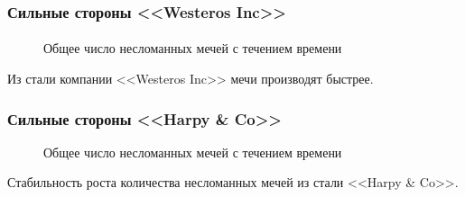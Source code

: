 \documentclass[10pt,pdf,hyperref={unicode}]{beamer}
\begin{document}
\begin{frame}
\frametitle{Сильные стороны <<Westeros Inc>>} 
\framesubtitle{}

\begin{minipage}{0.4\textwidth}
 	\begin{figure}[L]
		\caption{Общее число несломанных мечей с течением времени}		
	\end{figure}
\end{minipage}
\hfill
\begin{minipage}{0.4\textwidth}
	Из стали компании <<Westeros Inc>> мечи производят быстрее.
\end{minipage}
\end{frame}

\begin{frame}
\frametitle{Сильные стороны <<Harpy \& Co>>} 
\begin{minipage}{0.4\textwidth}
 	\begin{figure}[L]
		\caption{Общее число несломанных мечей с течением времени}
	\end{figure}
\end{minipage}
\hfill
\begin{minipage}{0.4\textwidth}
	Стабильность роста количества несломанных мечей из стали <<Harpy \& Co>>.
\end{minipage}
\end{frame}
\end{document}
